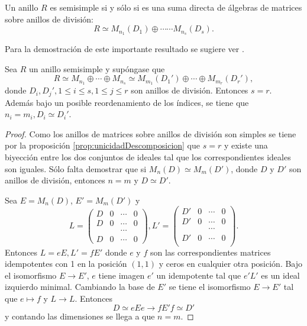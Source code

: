 \begin{teorema}
Un anillo $R$ es semisimple si y sólo si es una suma directa de álgebras de matrices sobre anillos de división:
\[ R \simeq M_{n_1}(D_1)\oplus \cdots \cdots M_{n_s}(D_s).  \]
\end{teorema}
Para la demostración de este importante resultado se sugiere ver \cite[página 200]{bib:AlgebraPostGrado}.
\begin{teorema}
Sea $R$ un anillo semisimple y supóngase que 
\[ R \simeq M_{n_1} \oplus \cdots \oplus M_{n_s} \simeq M_{m_1}(D_1')\oplus \cdots \oplus M_{m_r}(D_r'), \] donde $D_i, D_j', 1 \leq i \leq s, 1 \leq j \leq r$ son anillos de división. Entonces $s = r$. Además bajo un posible reordenamiento de los índices, se tiene que $n_i = m_i, D_i \simeq D_i'$. 
\end{teorema} 
\begin{proof}
Como los anillos de matrices sobre anillos de división son simples se tiene por la proposición \ref{prop:unicidadDescomposicion} que $s = r$ y existe una biyección entre los dos conjuntos de ideales tal que los correspondientes ideales son iguales. Sólo falta demostrar que si $M_n(D)\simeq M_m(D')$, donde $D$ y $D'$ son anillos de división, entonces $n = m$ y $D \simeq D'$.

Sea $E = M_n(D)$, $E' = M_m(D')$ y 
\[ L = \begin{pmatrix} 
D &  0 & \cdots & 0 \\
D &  0 & \cdots & 0 \\
 & & \cdots & \\
 D &  0 & \cdots & 0
\end{pmatrix} , L'=\begin{pmatrix}
D' & 0 & \cdots & 0\\
D' & 0 & \cdots & 0\\
 & & \cdots & \\
D' & 0 & \cdots & 0\\
\end{pmatrix}.\]
Entonces $L = eE, L'= fE'$ donde $e$ y $f$ son las correspondientes matrices idempotentes con 1 en la posición $(1,1)$ y ceros en cualquier otra posición. Bajo el isomorfismo $E \to E'$, $e$ tiene imagen $e'$ un idempotente tal que $e'L'$ es un ideal izquierdo minimal. Cambiando la base de $E'$ se tiene el isomorfismo $E \to E'$ tal que $e \mapsto f$ y $L \to L$. Entonces \[ D \simeq eEe \to fE'f \simeq D' \] y contando las dimensiones se llega a que $n = m$.  
\end{proof}
